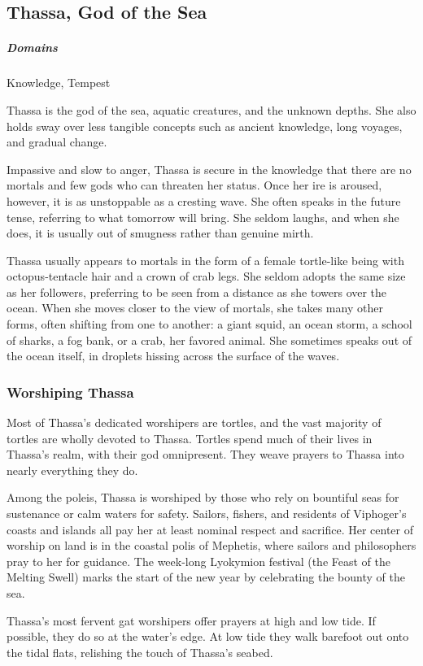 \subsection*{Thassa, God of the Sea} \label{ssec::thassa}
    \subparagraph{Domains} Knowledge, Tempest

    Thassa is the god of the sea, aquatic creatures, and the unknown depths.
    She also holds sway over less tangible concepts such as ancient knowledge, long voyages, and gradual change.

    Impassive and slow to anger, Thassa is secure in the knowledge that there are no mortals and few gods who can threaten her status.
    Once her ire is aroused, however, it is as unstoppable as a cresting wave.
    She often speaks in the future tense, referring to what tomorrow will bring.
    She seldom laughs, and when she does, it is usually out of smugness rather than genuine mirth.

    Thassa usually appears to mortals in the form of a female tortle-like being with octopus-tentacle hair and a crown of crab legs.
    She seldom adopts the same size as her followers, preferring to be seen from a distance as she towers over the ocean.
    When she moves closer to the view of mortals, she takes many other forms, often shifting from one to another: a giant squid, an ocean storm, a school of sharks, a fog bank, or a crab, her favored animal.
    She sometimes speaks out of the ocean itself, in droplets hissing across the surface of the waves.

    \subsubsection{Worshiping Thassa}
        Most of Thassa's dedicated worshipers are tortles, and the vast majority of tortles are wholly devoted to Thassa.
        Tortles spend much of their lives in Thassa's realm, with their god omnipresent.
        They weave prayers to Thassa into nearly everything they do.

        Among the poleis, Thassa is worshiped by those who rely on bountiful seas for sustenance or calm waters for safety.
        Sailors, fishers, and residents of Viphoger's coasts and islands all pay her at least nominal respect and sacrifice.
        Her center of worship on land is in the coastal polis of Mephetis, where sailors and philosophers pray to her for guidance.
        The week-long Lyokymion festival (the Feast of the Melting Swell) marks the start of the new year by celebrating the bounty of the sea.

        Thassa's most fervent gat worshipers offer prayers at high and low tide.
        If possible, they do so at the water's edge.
        At low tide they walk barefoot out onto the tidal flats, relishing the touch of Thassa's seabed.
